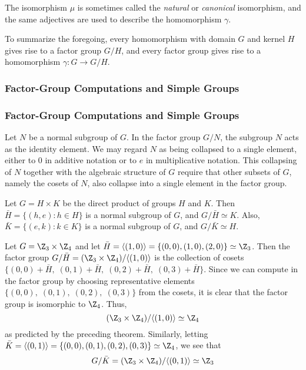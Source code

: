 The isomorphism $\mu$ is sometimes called the \emph{natural} or
\emph{canonical} isomorphism, and the same adjectives are used to
describe the homomorphism $\gamma$.

To summarize the foregoing, every homomorphism with domain $G$ and
kernel $H$ gives rise to a factor group $G/H$, and every factor group
gives rise to a homomorphism $\gamma: G \to G/H$. 

{\subsubsection{Factor-Group Computations and Simple Groups}}
{\subsubsection{Factor-Group Computations and Simple Groups\protect\footnotemark} 
}
Let $N$ be a normal subgroup of $G$.  In the factor group $G/N$, the
subgroup $N$ acts as the identity element.  We may regard $N$ as being
collapsed to a single element, either to 0 in additive notation or to
$e$ in multiplicative notation.  This collapsing of $N$ together with
the algebraic structure of $G$ require that other subsets of $G$,
namely the cosets of $N$, also collapse into a single element in the
factor group.
\begin{theorem}
Let $G=H\times K$ be the direct product of groups $H$
and $K$.  Then $\bar{H} = \{(h,e):h\in H\}$ is a normal subgroup of
$G$, and $G/\bar{H} \simeq K$.  Also, $\bar{K} = \{(e,k):k\in K\}$ is a
normal subgroup of $G$, and $G/\bar{K} \simeq H$.
\end{theorem}
\begin{example}
Let $G=\Z_3\times \Z_4$ and let $\bar{H} = \langle(1,0)\rangle =
\{(0,0),(1,0),(2,0)\} \simeq \Z_3$.  Then the factor group 
$G/\bar{H} = (\Z_3\times \Z_4)/\langle(1,0)\rangle$
is the collection of cosets
$\{(0,0)+\bar{H},\;(0,1)+\bar{H},\;(0,2)+\bar{H},\;(0,3)+\bar{H}\}$.
Since we can compute in the factor group by choosing representative
elements $\{(0,0),\;(0,1),\;(0,2),\;(0,3)\}$ from the cosets, it is
clear that the factor group is isomorphic to $\Z_4$.
Thus,
\[
(\Z_3\times \Z_4)/\langle(1,0)\rangle \simeq \Z_4
\]
as predicted by the preceding theorem.
Similarly, letting $\bar{K} = \langle(0,1)\rangle =
\{(0,0),(0,1),(0,2),(0,3)\} \simeq \Z_4$, we see that
\[
G/\bar{K} = (\Z_3\times \Z_4)/\langle(0,1)\rangle \simeq \Z_3
\]
\end{example}

